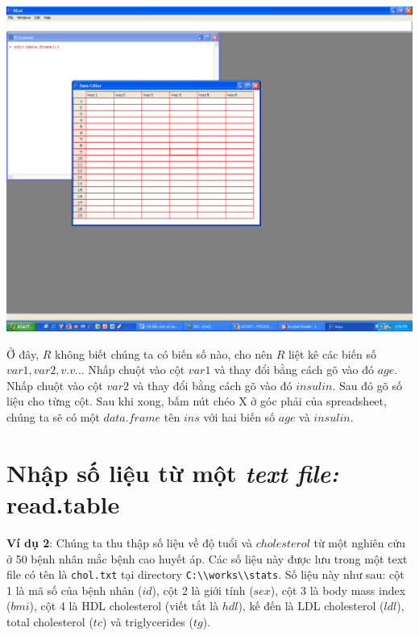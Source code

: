 \documentclass[
]{book}
\begin{document}
\includegraphics{_book_media/Figures/2.1.png}

Ở đây, \(R\) không biết chúng ta có biến số nào, cho nên \(R\) liệt kê các biến số \(var1, var2, v.v...\) Nhấp chuột vào cột \(var1\) và thay đổi bằng cách gõ vào đó \(age\). Nhấp chuột vào cột \(var2\) và thay đổi bằng cách gõ vào đó \(insulin\). Sau đó gõ số liệu cho từng cột. Sau khi xong, bấm nút chéo X ở góc phải của spreadsheet, chúng ta sẽ có một \(data.frame\) tên \(ins\) với hai biến số \(age\) và \(insulin\).

\hypertarget{nhux1eadp-sux1ed1-liux1ec7u-tux1eeb-mux1ed9t-text-file-read.table}{%
\section{\texorpdfstring{Nhập số liệu từ một \emph{text file:} read.table}{Nhập số liệu từ một text file: read.table}}\label{nhux1eadp-sux1ed1-liux1ec7u-tux1eeb-mux1ed9t-text-file-read.table}}

\textbf{Ví dụ 2}: Chúng ta thu thập số liệu về độ tuổi và \(cholesterol\) từ một nghiên cứu ở 50 bệnh nhân mắc bệnh cao huyết áp. Các số liệu này được lưu trong một text file có tên là \texttt{chol.txt} tại directory \texttt{C:\textbackslash{}\textbackslash{}works\textbackslash{}\textbackslash{}stats}. Số liệu này như sau: cột 1 là mã số của bệnh nhân (\(id\)), cột 2 là giới tính (\(sex\)), cột 3 là body mass index (\(bmi\)), cột 4 là HDL cholesterol (viết tắt là \(hdl\)), kế đến là LDL cholesterol (\(ldl\)), total cholesterol (\(tc\)) và triglycerides (\(tg\)).
\end{document}
